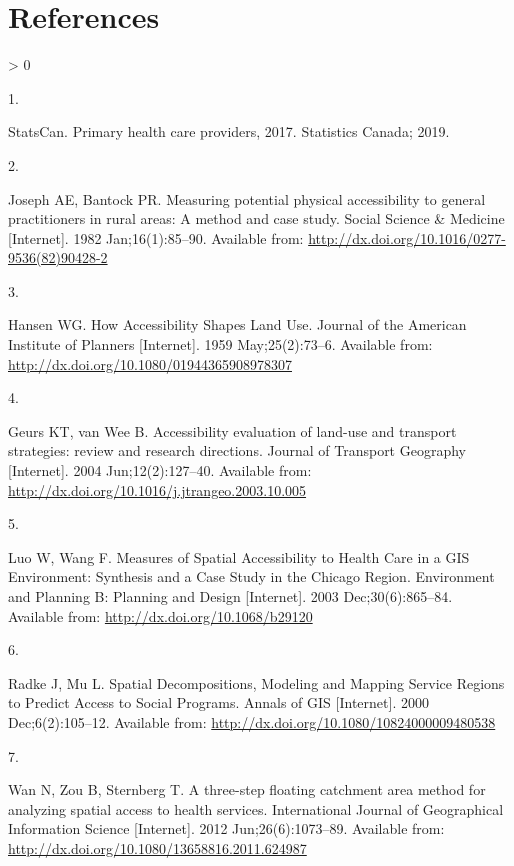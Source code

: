 \documentclass{article}
\newlength{\csllabelwidth}
\newlength{\cslhangindent}
\newenvironment{CSLReferences}[2] %
 {%
  \setlength{\parindent}{0pt}
  \ifodd #1 \everypar{\setlength{\hangindent}{\cslhangindent}}\ignorespaces\fi
  \ifnum #2 > 0
  \setlength{\parskip}{#2\baselineskip}
  \fi
 }%
 {}
\newcommand{\CSLLeftMargin}[1]{\parbox[t]{\csllabelwidth}{#1}}
\newcommand{\CSLRightInline}[1]{\parbox[t]{\linewidth - \csllabelwidth}{#1}\break}
\begin{document}
\hypertarget{references}{%
\section*{References}\label{references}}

\hypertarget{refs}{}
\begin{CSLReferences}{0}{0}
\leavevmode\hypertarget{ref-statcan2019}{}%
\CSLLeftMargin{1. }
\CSLRightInline{StatsCan. Primary health care providers, 2017.
Statistics Canada; 2019. }

\leavevmode\hypertarget{ref-joseph1982}{}%
\CSLLeftMargin{2. }
\CSLRightInline{Joseph AE, Bantock PR. Measuring potential physical
accessibility to general practitioners in rural areas: A method and case
study. Social Science \& Medicine {[}Internet{]}. 1982 Jan;16(1):85--90.
Available from: \url{http://dx.doi.org/10.1016/0277-9536(82)90428-2}}

\leavevmode\hypertarget{ref-hansen1959}{}%
\CSLLeftMargin{3. }
\CSLRightInline{Hansen WG. How Accessibility Shapes Land Use. Journal of
the American Institute of Planners {[}Internet{]}. 1959 May;25(2):73--6.
Available from: \url{http://dx.doi.org/10.1080/01944365908978307}}

\leavevmode\hypertarget{ref-geurs2004}{}%
\CSLLeftMargin{4. }
\CSLRightInline{Geurs KT, van Wee B. Accessibility evaluation of
land-use and transport strategies: review and research directions.
Journal of Transport Geography {[}Internet{]}. 2004 Jun;12(2):127--40.
Available from: \url{http://dx.doi.org/10.1016/j.jtrangeo.2003.10.005}}

\leavevmode\hypertarget{ref-luo2003}{}%
\CSLLeftMargin{5. }
\CSLRightInline{Luo W, Wang F. Measures of Spatial Accessibility to
Health Care in a GIS Environment: Synthesis and a Case Study in the
Chicago Region. Environment and Planning B: Planning and Design
{[}Internet{]}. 2003 Dec;30(6):865--84. Available from:
\url{http://dx.doi.org/10.1068/b29120}}

\leavevmode\hypertarget{ref-radke2000}{}%
\CSLLeftMargin{6. }
\CSLRightInline{Radke J, Mu L. Spatial Decompositions, Modeling and
Mapping Service Regions to Predict Access to Social Programs. Annals of
GIS {[}Internet{]}. 2000 Dec;6(2):105--12. Available from:
\url{http://dx.doi.org/10.1080/10824000009480538}}

\leavevmode\hypertarget{ref-wan2012}{}%
\CSLLeftMargin{7. }
\CSLRightInline{Wan N, Zou B, Sternberg T. A three-step floating
catchment area method for analyzing spatial access to health services.
International Journal of Geographical Information Science
{[}Internet{]}. 2012 Jun;26(6):1073--89. Available from:
\url{http://dx.doi.org/10.1080/13658816.2011.624987}}


\end{CSLReferences}
\end{document}
